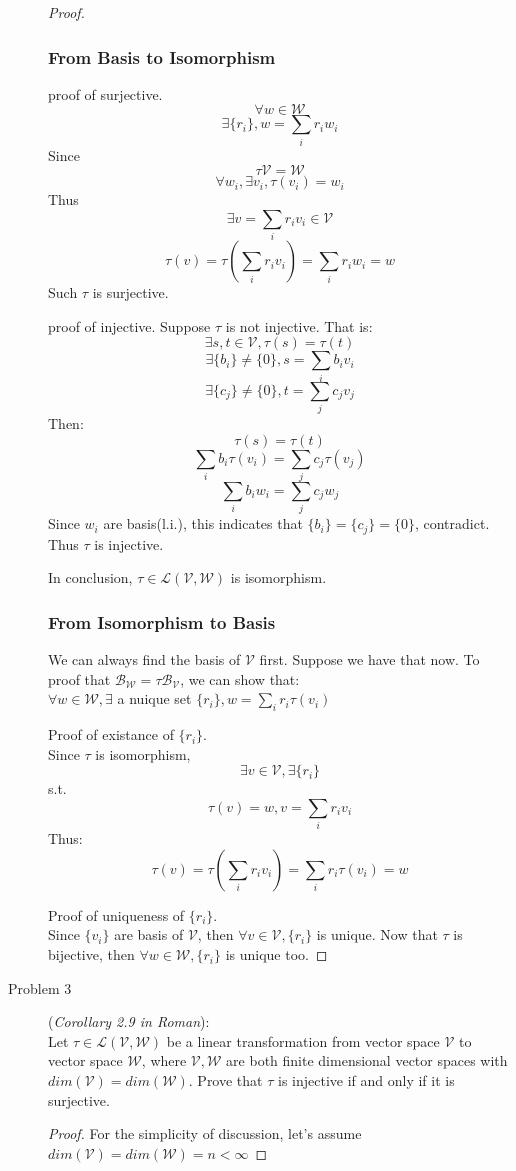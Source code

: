 \documentclass{article}
\begin{document}
\begin{description}
\begin{proof}
		\subsubsection*{From Basis to Isomorphism}
			\par proof of surjective.
				$$\forall w \in \mathcal{W}$$
				$$\exists \{r_i\}, w = \sum_i{r_iw_i}$$
				Since $$\tau\mathcal{V} = \mathcal{W}$$
				$$\forall w_i, \exists v_i, \tau(v_i) = w_i$$
				Thus 
				$$\exists v = \sum_i{r_iv_i} \in \mathcal{V}$$
				$$\tau(v) = \tau(\sum_i{r_iv_i}) = \sum_i{r_iw_i} = w$$
				Such $\tau$ is surjective.
			\par proof of injective.
				Suppose $\tau$ is not injective. That is:
				$$\exists s, t \in \mathcal{V}, \tau(s) = \tau(t)$$
				$$\exists \{b_i\} \neq \{0\}, s = \sum_i{b_iv_i}$$
				$$\exists \{c_j\} \neq \{0\}, t = \sum_j{c_jv_j}$$
				Then:
				$$ \tau(s) = \tau(t)$$
				$$ \sum_i{b_i\tau(v_i)} = \sum_j{c_j\tau(v_j)}$$
				$$ \sum_i{b_iw_i} = \sum_j{c_jw_j}$$
				Since ${w_i}$ are basis(l.i.), this indicates that $\{b_i\} = \{c_j\} = \{0\}$, contradict.
				Thus $\tau$ is injective.
			\par
				In conclusion, $\tau \in \mathcal{L}(\mathcal{V}, \mathcal{W})$ is isomorphism.
		\subsubsection*{From Isomorphism to Basis}
			We can always find the basis of $\mathcal{V}$ first. Suppose we have that now.
			To proof that $\mathcal{B_W} = \tau\mathcal{B_V}$, we can show that:\\
			$ \forall w \in \mathcal{W}, \exists$ a nuique set $\{r_i\}, w = \sum_i{r_i\tau(v_i)}$
			\par Proof of existance of $\{r_i\}$. \\
				Since $\tau$ is isomorphism, 
				$$\exists v \in \mathcal{V}, \exists \{r_i\}$$
				s.t. 
				$$\tau(v) = w, v = \sum_i{r_iv_i}$$
				Thus: 
				$$ \tau(v) = \tau(\sum_i{r_iv_i}) = \sum_i{r_i\tau(v_i)} = w$$
			\par Proof of uniqueness of $\{r_i\}$. \\
				Since $\{v_i\}$ are basis of $\mathcal{V}$, then $\forall v \in \mathcal{V}, \{r_i\}$ is unique.
				Now that $\tau$ is bijective, then $\forall w \in \mathcal{W}, \{r_i\}$ is unique too.
	\end{proof}

	\item[Problem 3] (\textit{Corollary 2.9 in Roman}):\\
	Let $\tau \in \mathcal{L}(\mathcal{V},\mathcal{W})$ be a linear transformation from vector space $\mathcal{V}$ to vector space $\mathcal{W}$, where $\mathcal{V},\mathcal{W}$ are both finite dimensional vector spaces with $dim(\mathcal{V})=dim(\mathcal{W})$. Prove that $\tau$ is injective if and only if it is surjective.\\
	\begin{proof}
		For the simplicity of discussion, let's assume $dim(\mathcal{V}) = dim(\mathcal{W}) = n < \infty$

\end{proof}
\end{description}
\end{document}
